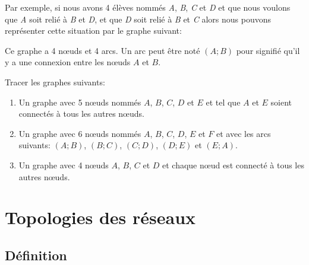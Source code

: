 \documentclass[11pt, a4paper]{book}
\begin{document}
Par exemple, si nous avons 4 élèves nommés {\it A}, {\it B}, {\it C} et  {\it D} et que nous voulons que  {\it A} soit relié à  {\it B} et  {\it D}, et que  {\it D} soit relié à  {\it B} et  {\it C} alors nous pouvons représenter cette situation par le graphe suivant:



\begin{center}
\end{center}


Ce graphe a 4 nœuds et 4 arcs. Un arc peut être noté $(A;B)$ pour signifié qu'il y a une connexion entre les nœuds $A$ et $B$.

\begin{exercice}
Tracer les graphes suivants:
\begin{enumerate}
\item Un graphe avec 5 nœuds  nommés $A$, $B$, $C$, $D$ et $E$ et tel que $A$ et $E$ soient connectés à tous les autres nœuds.
\item Un graphe avec 6 nœuds  nommés $A$, $B$, $C$, $D$, $E$ et $F$ et avec les arcs suivants: $(A;B)$, $(B;C)$, $(C;D)$, $(D;E)$ et $(E;A)$.
\item Un graphe avec 4 nœuds  $A$, $B$, $C$ et $D$ et chaque nœud est connecté à tous les autres nœuds.

\end{enumerate}

\end{exercice}


\section{Topologies des réseaux}

\subsection{Définition}
\end{document}
